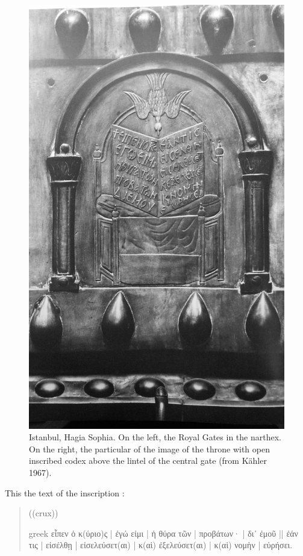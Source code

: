 \documentclass[amsthm,ebook]{saparticle}
\begin{document}
\begin{figure}[!bp]
 \includegraphics[width=\columnwidth]{FelleVisualFeaturesofinscriptionsEAGLE2016FullPaper-img013.jpg}
\caption{Istanbul, Hagia Sophia. On the left, the Royal Gates in the narthex. On the right, the particular of the image
of the throne with open inscribed codex above the lintel of the central gate (from Kähler 1967).}
\label{fig:9}
\end{figure}






This the text of the inscription \citep[n. 505]{felle_biblia_2006}: 

\begin{quotation}
((crux)) \begin{otherlanguage*}{greek}
εἶπεν ὁ κ(ύριο)ς | ἐγώ εἰμι | ἡ θύρα τῶν | προβάτων· | δι᾿ ἐμοῦ || ἐάν τις | εἰσέλθῃ | εἰσελεύσετ(αι) | κ(αὶ) ἐξελεύσετ(αι) | κ(αὶ) νομὴν | εὑρήσει.
\end{otherlanguage*}


\end{quotation}
\end{document}
